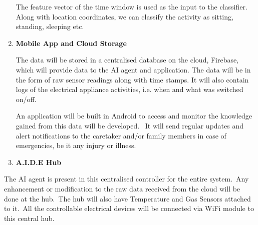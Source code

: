 \documentclass[12pt]{article}
\begin{document}
\begin{enumerate}

\par

\begin{justify}
The feature vector of the time window is used as the input to the classifier. Along with location coordinates, we can classify the activity as sitting, standing, sleeping etc.
\end{justify}\par


\vspace{\baselineskip}
	\item \textbf{Mobile App and Cloud Storage}\par

\begin{justify}
The data will be stored in a centralised database on the cloud, Firebase, which will provide data to the AI agent and application. The data will be in the form of raw sensor readings along with time stamps. It will also contain logs of the electrical appliance activities, i.e. when and what was switched on/off.
\end{justify}\par

\begin{justify}
An application will be built in Android to access and monitor the knowledge gained from this data will be developed.  It will send regular updates and alert notifications to the caretaker and/or family members in case of emergencies, be it any injury or illness.
\end{justify}\par


\vspace{\baselineskip}
	\item \textbf{A.I.D.E Hub}
\end{enumerate}\par

\begin{justify}
The AI agent is present in this centralised controller for the entire system. Any enhancement or modification to the raw data received from the cloud will be done at the hub. The hub will also have Temperature and Gas Sensors attached to it. All the controllable electrical devices will be connected via WiFi module to this central hub.
\end{justify}\par


\vspace{\baselineskip}
\end{document}

